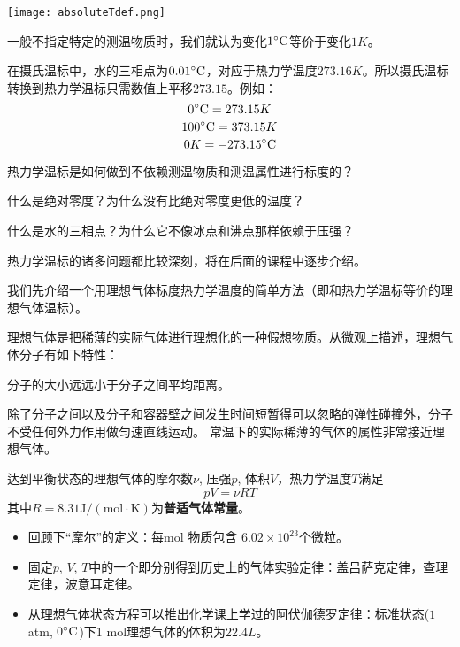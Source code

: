 \documentclass[CJK]{beamer}
\begin{document}
\begin{frame}
\bch
\texttt{[image: absoluteTdef.png]}

一般不指定特定的测温物质时，我们就认为变化$1^\circ \mathrm{C}$等价于变化$1K$。 

在摄氏温标中，水的三相点为$0.01^\circ \mathrm{C}$，对应于热力学温度$273.16K$。所以摄氏温标转换到热力学温标只需数值上平移$273.15$。例如： 
$$0^\circ \mathrm{C} = 273.15 K$$
$$100^\circ \mathrm{C} = 373.15K$$
$$0K = -273.15 ^\circ \mathrm{C}$$
\ech
\end{frame}

\begin{frame}
\bch
\bitem
\item{热力学温标是如何做到不依赖测温物质和测温属性进行标度的？}
\item{什么是绝对零度？为什么没有比绝对零度更低的温度？}
\item{什么是水的三相点？为什么它不像冰点和沸点那样依赖于压强？}
\eitem
\ech
\end{frame}


\begin{frame}
\bch
热力学温标的诸多问题都比较深刻，将在后面的课程中逐步介绍。

\skiplines

我们先介绍一个用理想气体标度热力学温度的简单方法（即和热力学温标等价的理想气体温标）。

\skiplines


理想气体是把稀薄的实际气体进行理想化的一种假想物质。从微观上描述，理想气体分子有如下特性：
\bitem
\item{分子的大小远远小于分子之间平均距离。}
\item{除了分子之间以及分子和容器壁之间发生时间短暂得可以忽略的弹性碰撞外，分子不受任何外力作用做匀速直线运动。}
\eitem
常温下的实际稀薄的气体的属性非常接近理想气体。

\ech
\end{frame}



\begin{frame}
\bch
{\large 达到平衡状态的理想气体的摩尔数$\nu$, 压强$p$, 体积$V$，热力学温度$T$满足
{\color{blue}
$$p V = \nu RT$$
}
其中$R=8.31 \mathrm{J/(mol\cdot K)}$为{\bf 普适气体常量}。
}

{\small
\begin{itemize}
\item{回顾下“摩尔”的定义：每mol 物质包含 $6.02\times 10^{23}$个微粒。}
\item{固定$p$, $V$, $T$中的一个即分别得到历史上的气体实验定律：盖吕萨克定律，查理定律，波意耳定律。}
\item{从理想气体状态方程可以推出化学课上学过的阿伏伽德罗定律：标准状态($1$ atm, $0^\circ \mathrm{C}$)下1 mol理想气体的体积为$22.4L$。}
\end{itemize}
}
\ech
\end{frame}
\end{document}
